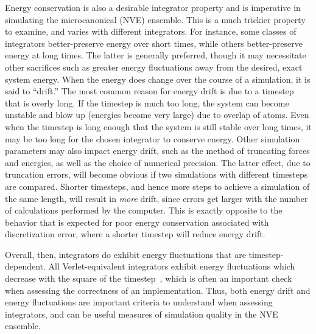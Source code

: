 \documentclass[9pt,bestpractices]{livecoms}
\begin{document}
Energy conservation is also a desirable integrator property and is imperative in simulating the microcanonical (NVE) ensemble.
This is a much trickier property to examine, and varies with different integrators.
For instance, some classes of integrators better-preserve energy over short times, while others better-preserve energy at long times.
The latter is generally preferred, though it may necessitate other sacrifices such as greater energy fluctuations away from the desired, exact system energy.
When the energy does change over the course of a simulation, it is said to ``drift.''
The most common reason for energy drift is due to a timestep that is overly long.
If the timestep is much too long, the system can become unstable and blow up (energies become very large) due to overlap of atoms.
Even when the timestep is long enough that the system is still stable over long times, it may be too long for the chosen integrator to conserve energy.
Other simulation parameters may also impact energy drift, such as the method of truncating forces and energies, as well as the choice of numerical precision.
The latter effect, due to truncation errors, will become obvious if two simulations with different timesteps are compared.
Shorter timesteps, and hence more steps to achieve a simulation of the same length, will result in \textit{more} drift, since errors get larger with the number of calculations performed by the computer.
This is exactly opposite to the behavior that is expected for poor energy conservation associated with discretization error, where a shorter timestep will reduce energy drift.

Overall, then, integrators do exhibit energy fluctuations that are timestep-dependent.
All Verlet-equivalent integrators exhibit energy fluctuations which decrease with the square of the timestep~\cite{allen_computer_2017}, which is often an important check when assessing the correctness of an implementation.
Thus, both energy drift and energy fluctuations are important criteria to understand when assessing integrators, and can be useful measures of simulation quality in the NVE ensemble.
\end{document}
